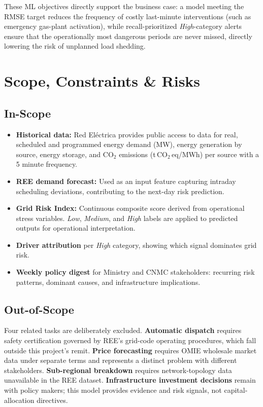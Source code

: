 \documentclass[11pt, a4paper]{article}
\begin{document}
These ML objectives directly support the business case: a model meeting the
RMSE target reduces the frequency of costly last-minute interventions (such
as emergency gas-plant activation), while recall-prioritized \textit{High}-category
alerts ensure that the operationally most dangerous periods are never missed,
directly lowering the risk of unplanned load shedding.

\section{Scope, Constraints \& Risks}

\subsection{In-Scope}

\begin{itemize}
  \item \textbf{Historical data:} Red Eléctrica provides public access to data for real, scheduled and programmed energy demand (MW), energy generation by source, energy storage, and CO$_2$ emissions (t\,CO$_2$\,eq/MWh) per source with a 5 minute frequency.
  \item \textbf{REE demand forecast:} Used as an input feature capturing intraday scheduling deviations, contributing to the next-day risk prediction.
  \item \textbf{Grid Risk Index:} Continuous composite score derived from operational stress variables. \textit{Low}, \textit{Medium}, and \textit{High} labels are applied to predicted outputs for operational interpretation.
  \item \textbf{Driver attribution} per \textit{High} category, showing which signal dominates grid risk.
  \item \textbf{Weekly policy digest} for Ministry and CNMC stakeholders: recurring risk patterns, dominant causes, and infrastructure implications.
\end{itemize}

\subsection{Out-of-Scope}
Four related tasks are deliberately excluded. \textbf{Automatic dispatch} requires safety certification governed by REE's grid-code operating procedures, which fall outside this project's remit. \textbf{Price forecasting} requires OMIE wholesale market data under separate terms and represents a distinct problem with different stakeholders. \textbf{Sub-regional breakdown} requires network-topology data unavailable in the REE dataset. \textbf{Infrastructure investment decisions} remain with policy makers; this model provides evidence and risk signals, not capital-allocation directives.
\end{document}
